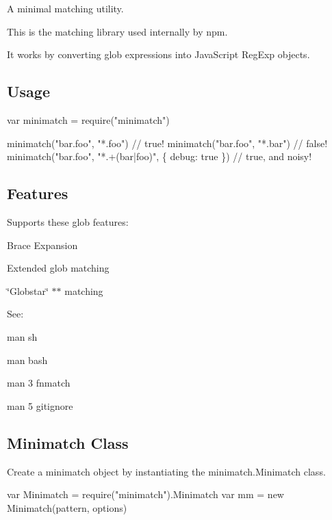 A minimal matching utility.

\href{http://travis-ci.org/isaacs/minimatch}{\tt }

This is the matching library used internally by npm.

It works by converting glob expressions into Java\+Script {\ttfamily Reg\+Exp} objects.

\subsection*{Usage}


\begin{DoxyCode}
var minimatch = require("minimatch")

minimatch("bar.foo", "*.foo") // true!
minimatch("bar.foo", "*.bar") // false!
minimatch("bar.foo", "*.+(bar|foo)", \{ debug: true \}) // true, and noisy!
\end{DoxyCode}


\subsection*{Features}

Supports these glob features\+:


\begin{DoxyItemize}
\item Brace Expansion
\item Extended glob matching
\item \char`\"{}\+Globstar\char`\"{} {\ttfamily $\ast$$\ast$} matching
\end{DoxyItemize}

See\+:


\begin{DoxyItemize}
\item {\ttfamily man sh}
\item {\ttfamily man bash}
\item {\ttfamily man 3 fnmatch}
\item {\ttfamily man 5 gitignore}
\end{DoxyItemize}

\subsection*{Minimatch Class}

Create a minimatch object by instantiating the {\ttfamily minimatch.\+Minimatch} class.


\begin{DoxyCode}
var Minimatch = require("minimatch").Minimatch
var mm = new Minimatch(pattern, options)
\end{DoxyCode}



